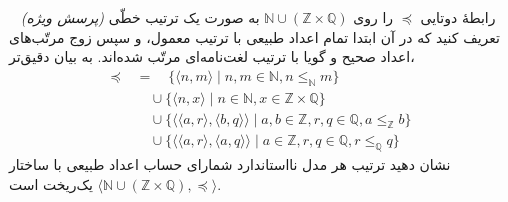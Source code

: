 ~
\emph{(پرسش ویژه)} \;
رابطهٔ دوتایی $\preceq$ را روی $\mathbb{N} \cup (\mathbb{Z} \times \mathbb{Q})$ به صورت یک ترتیب خطّی تعریف کنید که در آن ابتدا تمام اعداد طبیعی با ترتیب معمول، و سپس زوج مرتّب‌های اعداد صحیح و گویا با ترتیب لغت‌نامه‌ای مرتّب شده‌اند. به بیان دقیق‌تر،
\begin{align*}
  \preceq & = \quad \{ \langle n, m \rangle \mid n, m \in \mathbb{N}, n \le_\mathbb{N} m \} \\
  \quad & \quad \cup \{ \langle n, x \rangle \mid n \in \mathbb{N}, x \in \mathbb{Z} \times \mathbb{Q} \} \\
  \quad & \quad \cup \{ \langle \langle a, r \rangle, \langle b, q \rangle \rangle \mid a, b \in \mathbb{Z}, r, q \in \mathbb{Q}, a \le_\mathbb{Z} b \} \\
  \quad & \quad \cup \{ \langle \langle a, r \rangle, \langle a, q \rangle \rangle \mid a \in \mathbb{Z}, r, q \in \mathbb{Q}, r \le_\mathbb{Q} q \}
\end{align*}
نشان دهید ترتیب هر مدل نااستاندارد شمارای حساب اعداد طبیعی با ساختار $\langle \mathbb{N} \cup (\mathbb{Z} \times \mathbb{Q}), \preceq \rangle$ یک‌ریخت است.